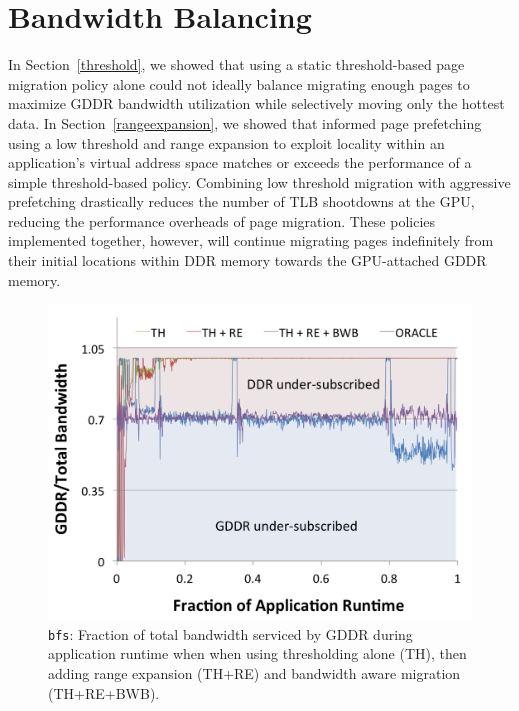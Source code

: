 \section{Bandwidth Balancing}
In Section~\ref{threshold}, we showed that using a static threshold-based page migration policy alone could
not ideally balance migrating enough pages to maximize GDDR bandwidth utilization while selectively moving
only the hottest data.  In Section~\ref{rangeexpansion}, we showed that informed page prefetching using
a low threshold and range expansion to exploit locality within an application's virtual address space matches or exceeds the performance of a simple threshold-based policy.  Combining low threshold migration with aggressive prefetching drastically
reduces the number of TLB shootdowns at the GPU, reducing the performance overheads of
page migration.  These policies implemented together, however, will continue migrating pages
indefinitely from their initial locations within DDR memory towards the GPU-attached GDDR memory.

\begin{figure}[t]
\centering
    \includegraphics[width=0.9\columnwidth]{hpca2015/figures/bfs-bw-ratio.png}
    \caption{{\tt bfs}: Fraction of total bandwidth serviced by GDDR during application
runtime when when using thresholding alone (TH), then adding range expansion
(TH+RE) and bandwidth aware migration (TH+RE+BWB).}
    \label{fig:migrationlimiting-bfs}
\end{figure}

